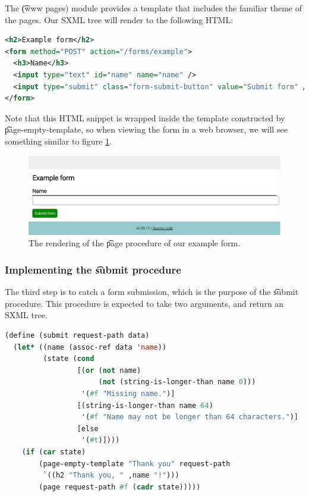   The \t{(www pages)} module provides a template that includes the familiar
  theme of the  pages.  Our SXML tree will render to the
  following HTML:

\begin{lstlisting}[language=XML]
<h2>Example form</h2>
<form method="POST" action="/forms/example">
  <h3>Name</h3>
  <input type="text" id="name" name="name" />
  <input type="submit" class="form-submit-button" value="Submit form" />
</form>
\end{lstlisting}

  Note that this HTML snippet is wrapped inside the template constructed by
  \t{page-empty-template}, so when viewing the form in a web browser, we
  will see something similar to figure \ref{fig:web-form-example}.

  \begin{figure}[H]
    \begin{center}
      \includegraphics[width=1.0\textwidth]{figures/sg-web-form-example.pdf}
    \end{center}
    \caption{The rendering of the \t{page} procedure of our example form.}
    \label{fig:web-form-example}
  \end{figure}

\subsubsection{Implementing the \t{submit} procedure}

  The third step is to catch a form submission, which is the purpose of the
  \t{submit} procedure.  This procedure is expected to take two arguments,
  and return an SXML tree.

\begin{lstlisting}[language=Lisp]
(define (submit request-path data)
  (let* ((name (assoc-ref data 'name))
         (state (cond
                 [(or (not name)
                      (not (string-is-longer-than name 0)))
                  '(#f "Missing name.")]
                 [(string-is-longer-than name 64)
                  '(#f "Name may not be longer than 64 characters.")]
                 [else
                  '(#t)])))
    (if (car state)
        (page-empty-template "Thank you" request-path
         `((h2 "Thank you, " ,name "!")))
        (page request-path #f (cadr state)))))
\end{lstlisting}

